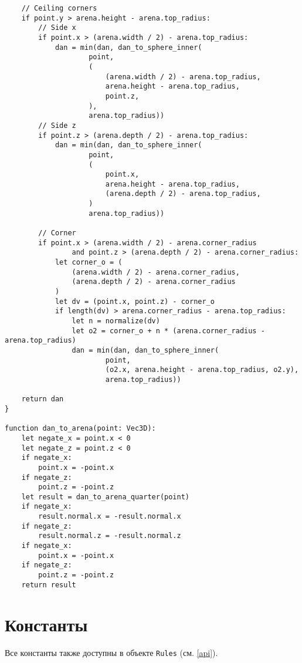 \begin{verbatim}
    // Ceiling corners
    if point.y > arena.height - arena.top_radius:
        // Side x
        if point.x > (arena.width / 2) - arena.top_radius:
            dan = min(dan, dan_to_sphere_inner(
                    point,
                    (
                        (arena.width / 2) - arena.top_radius,
                        arena.height - arena.top_radius,
                        point.z,
                    ),
                    arena.top_radius))
        // Side z
        if point.z > (arena.depth / 2) - arena.top_radius:
            dan = min(dan, dan_to_sphere_inner(
                    point,
                    (
                        point.x,
                        arena.height - arena.top_radius,
                        (arena.depth / 2) - arena.top_radius,
                    )
                    arena.top_radius))

        // Corner
        if point.x > (arena.width / 2) - arena.corner_radius
                and point.z > (arena.depth / 2) - arena.corner_radius:
            let corner_o = (
                (arena.width / 2) - arena.corner_radius,
                (arena.depth / 2) - arena.corner_radius
            )
            let dv = (point.x, point.z) - corner_o
            if length(dv) > arena.corner_radius - arena.top_radius:
                let n = normalize(dv)
                let o2 = corner_o + n * (arena.corner_radius - arena.top_radius)
                dan = min(dan, dan_to_sphere_inner(
                        point,
                        (o2.x, arena.height - arena.top_radius, o2.y),
                        arena.top_radius))
    
    return dan    
}

function dan_to_arena(point: Vec3D):
    let negate_x = point.x < 0
    let negate_z = point.z < 0
    if negate_x:
        point.x = -point.x
    if negate_z:
        point.z = -point.z
    let result = dan_to_arena_quarter(point)
    if negate_x:
        result.normal.x = -result.normal.x
    if negate_z:
        result.normal.z = -result.normal.z
    if negate_x:
        point.x = -point.x
    if negate_z:
        point.z = -point.z
    return result
\end{verbatim}

\section{Константы}\label{constants}

Все константы также доступны в объекте \texttt{Rules} (см. \ref{api}).

